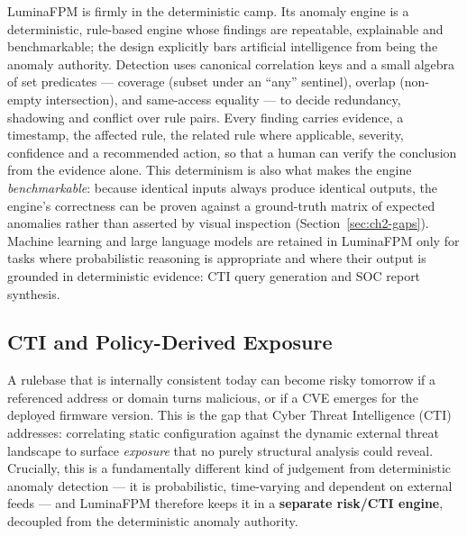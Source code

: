 LuminaFPM is firmly in the deterministic camp. Its anomaly engine is a deterministic, rule-based engine whose findings are repeatable, explainable and benchmarkable; the design explicitly bars artificial intelligence from being the anomaly authority. Detection uses canonical correlation keys and a small algebra of set predicates --- coverage (subset under an ``any'' sentinel), overlap (non-empty intersection), and same-access equality --- to decide redundancy, shadowing and conflict over rule pairs. Every finding carries evidence, a timestamp, the affected rule, the related rule where applicable, severity, confidence and a recommended action, so that a human can verify the conclusion from the evidence alone. This determinism is also what makes the engine \emph{benchmarkable}: because identical inputs always produce identical outputs, the engine's correctness can be proven against a ground-truth matrix of expected anomalies rather than asserted by visual inspection (Section~\ref{sec:ch2-gaps}). Machine learning and large language models are retained in LuminaFPM only for tasks where probabilistic reasoning is appropriate and where their output is grounded in deterministic evidence: CTI query generation and SOC report synthesis.

\subsection{CTI and Policy-Derived Exposure}
A rulebase that is internally consistent today can become risky tomorrow if a referenced address or domain turns malicious, or if a CVE emerges for the deployed firmware version. This is the gap that Cyber Threat Intelligence (CTI) addresses: correlating static configuration against the dynamic external threat landscape to surface \emph{exposure} that no purely structural analysis could reveal. Crucially, this is a fundamentally different kind of judgement from deterministic anomaly detection --- it is probabilistic, time-varying and dependent on external feeds --- and LuminaFPM therefore keeps it in a \textbf{separate risk/CTI engine}, decoupled from the deterministic anomaly authority.

